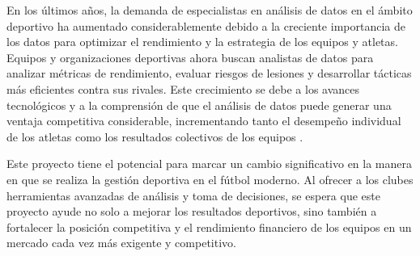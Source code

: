 En los últimos años, la demanda de especialistas en análisis de datos en el ámbito deportivo ha aumentado considerablemente debido a la creciente importancia de los datos para optimizar el rendimiento y la estrategia de los equipos y atletas. Equipos y organizaciones deportivas ahora buscan analistas de datos para analizar métricas de rendimiento, evaluar riesgos de lesiones y desarrollar tácticas más eficientes contra sus rivales. Este crecimiento se debe a los avances tecnológicos y a la comprensión de que el análisis de datos puede generar una ventaja competitiva considerable, incrementando tanto el desempeño individual de los atletas como los resultados colectivos de los equipos \cite{incremento-ia-deporte}.

Este proyecto tiene el potencial para marcar un cambio significativo en la manera en que se realiza la gestión deportiva en el fútbol moderno. Al ofrecer a los clubes herramientas avanzadas de análisis y toma de decisiones, se espera que este proyecto ayude no solo a mejorar los resultados deportivos, sino también a fortalecer la posición competitiva y el rendimiento financiero de los equipos en un mercado cada vez más exigente y competitivo.













